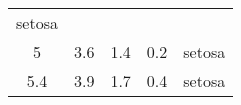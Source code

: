 \documentclass[]{article}
\begin{document}
\begin{longtable}[c]{@{}ccccc@{}}
\begin{minipage}[t]{0.11\columnwidth}\centering\strut
setosa
\strut\end{minipage}\tabularnewline
\begin{minipage}[t]{0.18\columnwidth}\centering\strut
5
\strut\end{minipage} &
\begin{minipage}[t]{0.17\columnwidth}\centering\strut
3.6
\strut\end{minipage} &
\begin{minipage}[t]{0.18\columnwidth}\centering\strut
1.4
\strut\end{minipage} &
\begin{minipage}[t]{0.17\columnwidth}\centering\strut
0.2
\strut\end{minipage} &
\begin{minipage}[t]{0.11\columnwidth}\centering\strut
setosa
\strut\end{minipage}\tabularnewline
\begin{minipage}[t]{0.18\columnwidth}\centering\strut
5.4
\strut\end{minipage} &
\begin{minipage}[t]{0.17\columnwidth}\centering\strut
3.9
\strut\end{minipage} &
\begin{minipage}[t]{0.18\columnwidth}\centering\strut
1.7
\strut\end{minipage} &
\begin{minipage}[t]{0.17\columnwidth}\centering\strut
0.4
\strut\end{minipage} &
\begin{minipage}[t]{0.11\columnwidth}\centering\strut
setosa
\strut\end{minipage}\tabularnewline
\bottomrule
\end{longtable}
\end{document}
